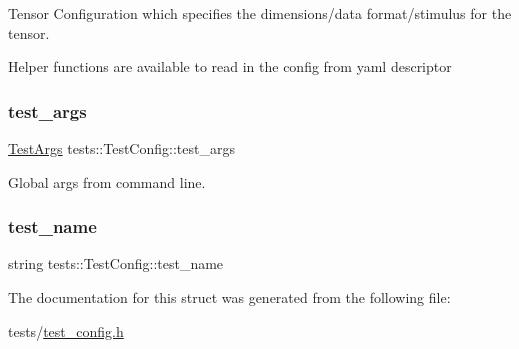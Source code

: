 Tensor Configuration which specifies the dimensions/data format/stimulus for the tensor. 

Helper functions are available to read in the config from yaml descriptor \mbox{\label{structtests_1_1TestConfig_aa030c4b4c3fb91e5d6ac2524d408e727}} 
\subsubsection{\texorpdfstring{test\+\_\+args}{test\_args}}
{\footnotesize\ttfamily \hyperlink{structtests_1_1TestArgs}{Test\+Args} tests\+::\+Test\+Config\+::test\+\_\+args}



Global args from command line. 

\mbox{\label{structtests_1_1TestConfig_aee3a781ac75f698787b6fcd81ca060bb}} 
\subsubsection{\texorpdfstring{test\+\_\+name}{test\_name}}
{\footnotesize\ttfamily string tests\+::\+Test\+Config\+::test\+\_\+name}



The documentation for this struct was generated from the following file\+:\begin{DoxyCompactItemize}
\item 
tests/\hyperlink{test__config_8h}{test\+\_\+config.\+h}\end{DoxyCompactItemize}
